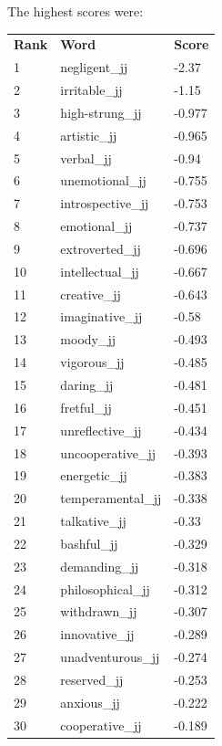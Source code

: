 \documentclass[10pt,letterpaper]{book}
\begin{document}
The highest scores were:
\begin{tabular}{ l l l }
        \textbf{Rank} & \textbf{Word} & \textbf{Score} \\
        1 & negligent\_jj & -2.37 \\
        2 & irritable\_jj & -1.15 \\
        3 & high-strung\_jj & -0.977 \\
        4 & artistic\_jj & -0.965 \\
        5 & verbal\_jj & -0.94 \\
        6 & unemotional\_jj & -0.755 \\
        7 & introspective\_jj & -0.753 \\
        8 & emotional\_jj & -0.737 \\
        9 & extroverted\_jj & -0.696 \\
        10 & intellectual\_jj & -0.667 \\
        11 & creative\_jj & -0.643 \\
        12 & imaginative\_jj & -0.58 \\
        13 & moody\_jj & -0.493 \\
        14 & vigorous\_jj & -0.485 \\
        15 & daring\_jj & -0.481 \\
        16 & fretful\_jj & -0.451 \\
        17 & unreflective\_jj & -0.434 \\
        18 & uncooperative\_jj & -0.393 \\
        19 & energetic\_jj & -0.383 \\
        20 & temperamental\_jj & -0.338 \\
        21 & talkative\_jj & -0.33 \\
        22 & bashful\_jj & -0.329 \\
        23 & demanding\_jj & -0.318 \\
        24 & philosophical\_jj & -0.312 \\
        25 & withdrawn\_jj & -0.307 \\
        26 & innovative\_jj & -0.289 \\
        27 & unadventurous\_jj & -0.274 \\
        28 & reserved\_jj & -0.253 \\
        29 & anxious\_jj & -0.222 \\
        30 & cooperative\_jj & -0.189 \\
\end{tabular}
\end{document}
